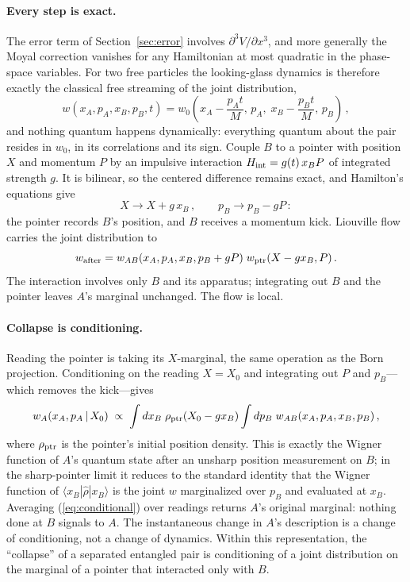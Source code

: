 \documentclass[12pt]{article}
\begin{document}
\paragraph{Every step is exact.}
The error term of Section~\ref{sec:error} involves $\partial^3 V/\partial x^3$, and more generally the Moyal correction vanishes for any Hamiltonian at most quadratic in the phase-space variables.
For two free particles the looking-glass dynamics is therefore exactly the classical free streaming of the joint distribution,
\begin{equation}
w(x_A,p_A,x_B,p_B,t) = w_0\!\left(x_A - \frac{p_A t}{M},\, p_A,\; x_B - \frac{p_B t}{M},\, p_B\right) \,,
\end{equation}
and nothing quantum happens dynamically: everything quantum about the pair resides in $w_0$, in its correlations and its sign.
Couple $B$ to a pointer with position $X$ and momentum $P$ by an impulsive interaction $H_{\rm int} = g(t)\, x_B P$ of integrated strength $g$.
It is bilinear, so the centered difference remains exact, and Hamilton's equations give
\begin{equation}
X \rightarrow X + g\, x_B \,, \qquad p_B \rightarrow p_B - g P \,:
\end{equation}
the pointer records $B$'s position, and $B$ receives a momentum kick.
Liouville flow carries the joint distribution to
\begin{equation}
w_{\rm after} = w_{AB}(x_A, p_A, x_B, p_B + gP)\; w_{\rm ptr}(X - g x_B, P) \,.
\end{equation}
The interaction involves only $B$ and its apparatus; integrating out $B$ and the pointer leaves $A$'s marginal unchanged.
The flow is local.

\paragraph{Collapse is conditioning.}
Reading the pointer is taking its $X$-marginal, the same operation as the Born projection.
Conditioning on the reading $X = X_0$ and integrating out $P$ and $p_B$---which removes the kick---gives
\begin{equation}\label{eq:conditional}
w_A(x_A, p_A \,|\, X_0) \;\propto\; \int dx_B\; \rho_{\rm ptr}(X_0 - g x_B) \int dp_B\; w_{AB}(x_A, p_A, x_B, p_B) \,,
\end{equation}
where $\rho_{\rm ptr}$ is the pointer's initial position density.
This is exactly the Wigner function of $A$'s quantum state after an unsharp position measurement on $B$; in the sharp-pointer limit it reduces to the standard identity that the Wigner function of $\langle x_B|\hat\rho|x_B\rangle$ is the joint $w$ marginalized over $p_B$ and evaluated at $x_B$.
Averaging (\ref{eq:conditional}) over readings returns $A$'s original marginal: nothing done at $B$ signals to $A$.
The instantaneous change in $A$'s description is a change of conditioning, not a change of dynamics.
Within this representation, the ``collapse'' of a separated entangled pair is conditioning of a joint distribution on the marginal of a pointer that interacted only with $B$.
\end{document}
